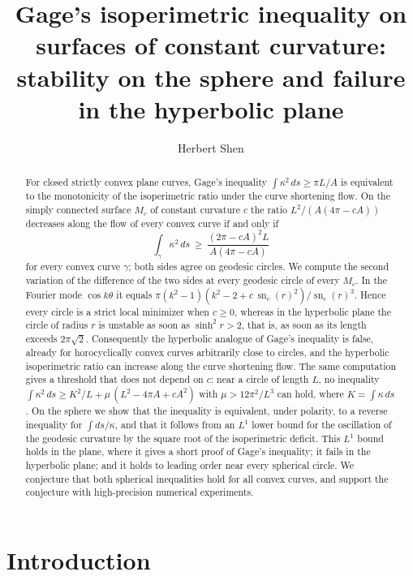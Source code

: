 \documentclass[11pt]{amsart}
\title[Gage's inequality in constant curvature]{Gage's isoperimetric inequality on surfaces of constant curvature: stability on the sphere and failure in the hyperbolic plane}
\author{Herbert Shen}
\date{}
\theoremstyle{definition}
\theoremstyle{remark}
\numberwithin{equation}{section}
\DeclareMathOperator{\sn}{sn}
\begin{document}
\begin{abstract}
For closed strictly convex plane curves, Gage's inequality $\int\kappa^2\,ds\ge\pi L/A$ is equivalent to the monotonicity of the isoperimetric ratio under the curve shortening flow. On the simply connected surface $M_c$ of constant curvature $c$ the ratio $L^2/(A(4\pi-cA))$ decreases along the flow of every convex curve if and only if
\[
\int_\gamma\kappa^2\,ds\ \ge\ \frac{(2\pi-cA)^2L}{A(4\pi-cA)}
\]
for every convex curve $\gamma$; both sides agree on geodesic circles. We compute the second variation of the difference of the two sides at every geodesic circle of every $M_c$. In the Fourier mode $\cos k\theta$ it equals $\pi(k^2-1)(k^2-2+c\,\sn_c(r)^2)/\sn_c(r)^3$. Hence every circle is a strict local minimizer when $c\ge 0$, whereas in the hyperbolic plane the circle of radius $r$ is unstable as soon as $\sinh^2 r>2$, that is, as soon as its length exceeds $2\pi\sqrt2$. Consequently the hyperbolic analogue of Gage's inequality is false, already for horocyclically convex curves arbitrarily close to circles, and the hyperbolic isoperimetric ratio can increase along the curve shortening flow. The same computation gives a threshold that does not depend on $c$: near a circle of length $L$, no inequality $\int\kappa^2\,ds\ge K^2/L+\mu\,(L^2-4\pi A+cA^2)$ with $\mu>12\pi^2/L^3$ can hold, where $K=\int\kappa\,ds$. On the sphere we show that the inequality is equivalent, under polarity, to a reverse inequality for $\int ds/\kappa$, and that it follows from an $L^1$ lower bound for the oscillation of the geodesic curvature by the square root of the isoperimetric deficit. This $L^1$ bound holds in the plane, where it gives a short proof of Gage's inequality; it fails in the hyperbolic plane; and it holds to leading order near every spherical circle. We conjecture that both spherical inequalities hold for all convex curves, and support the conjecture with high-precision numerical experiments.
\end{abstract}

\maketitle

\section{Introduction}\label{sec:intro}
\end{document}

